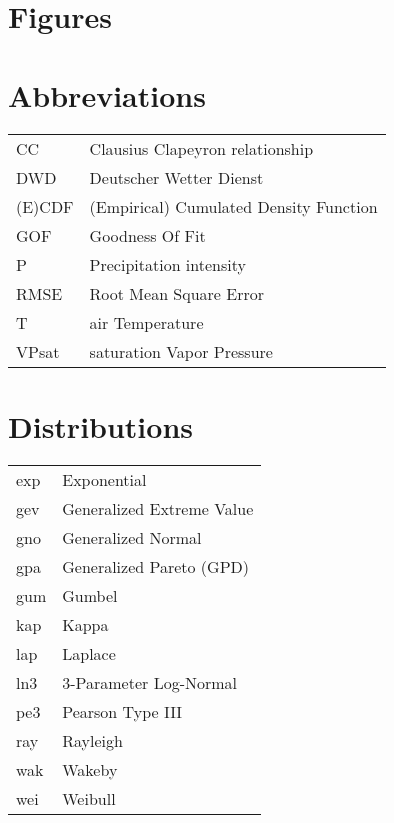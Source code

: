 \documentclass[a4paper]{article}
\begin{document}
\begin{multicols}{2}

\begin{spacing}{0.1}
\tableofcontents
\end{spacing} 


\section*{Figures}

\makeatletter
{}%
\makeatother

\section*{Abbreviations}

\begin{tabular}{l|l}
CC     & Clausius Clapeyron relationship\\
DWD    & Deutscher Wetter Dienst\\
(E)CDF & (Empirical) Cumulated Density Function\\
GOF    & Goodness Of Fit\\
P      & Precipitation intensity\\
RMSE   & Root Mean Square Error\\
T      & air Temperature\\
VPsat  & saturation Vapor Pressure\\
\end{tabular}

\hypertarget{distnames}{}
\section*{Distributions}

\begin{tabular}{l|l}
exp	&	Exponential \\
gev	&	Generalized Extreme Value	\\
gno	&	Generalized Normal	\\
gpa	&	Generalized Pareto (GPD) \\
gum	&	Gumbel	\\
kap	&	Kappa	\\
lap	&	Laplace	\\
ln3	&	3-Parameter Log-Normal	\\
pe3	&	Pearson Type III	\\
ray	&	Rayleigh	\\
wak	&	Wakeby	\\
wei	&	Weibull	\\
\end{tabular}


\end{multicols}
\end{document}
